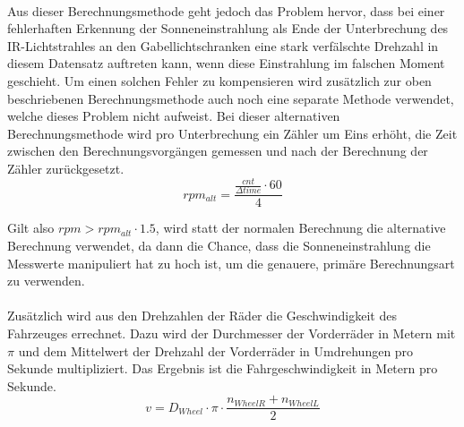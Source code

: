 \\
Aus dieser Berechnungsmethode geht jedoch das Problem hervor, dass bei einer fehlerhaften Erkennung der Sonneneinstrahlung als Ende der Unterbrechung des \ac{IR}-Lichtstrahles an den Gabellichtschranken eine stark verfälschte Drehzahl in diesem Datensatz auftreten kann, wenn diese Einstrahlung im falschen Moment geschieht. Um einen solchen Fehler zu kompensieren wird zusätzlich zur oben beschriebenen Berechnungsmethode auch noch eine separate Methode verwendet, welche dieses Problem nicht aufweist. Bei dieser alternativen Berechnungsmethode wird pro Unterbrechung ein Zähler um Eins erhöht, die Zeit zwischen den Berechnungsvorgängen gemessen und nach der Berechnung der Zähler zurückgesetzt.
\begin{equation}
rpm_{alt}=\frac{\frac{cnt}{\Delta time}\cdot 60}{4}
\label{eqn:altrpm}
\end{equation}

Gilt also $rpm > rpm_{alt} \cdot 1.5$, wird statt der normalen Berechnung die alternative Berechnung verwendet, da dann die Chance, dass die Sonneneinstrahlung die Messwerte manipuliert hat zu hoch ist, um die genauere, primäre Berechnungsart zu verwenden.\\\\
Zusätzlich wird aus den Drehzahlen der Räder die Geschwindigkeit des Fahrzeuges errechnet. Dazu wird der Durchmesser der Vorderräder in Metern mit $\pi$ und dem Mittelwert der Drehzahl der Vorderräder in Umdrehungen pro Sekunde multipliziert. Das Ergebnis ist die Fahrgeschwindigkeit in Metern pro Sekunde.
\begin{equation}
v=D_{Wheel}\cdot\pi\cdot\frac{n_{WheelR}+n_{WheelL}}{2}
\label{eqn:velocity}
\end{equation}


